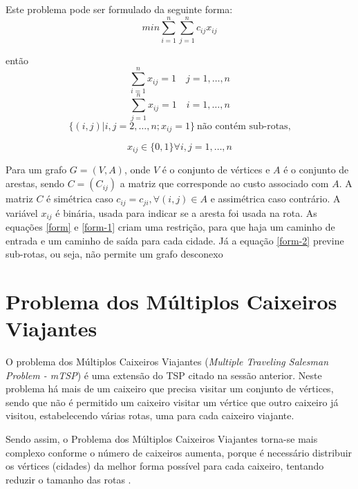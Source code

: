 \documentclass[12pt,openright,a4paper,oneside]{tcc}
\begin{document}
		Este problema pode ser formulado da seguinte forma:
		\begin{equation}
 		   	min\sum_{i=1}^{n} \sum_{j=1}^{n} c_{ij} x_{ij}
		\end{equation}
		
		então		
		\begin{equation}
			\label{form}
 		   	\sum_{i=1}^{n} x_{ij} = 1 \quad j=1,\dots,n
		\end{equation}
		\begin{equation}
			\label{form-1}
 		   	\sum_{j=1}^{n} x_{ij} = 1 \quad i=1,\dots,n
		\end{equation}
		\begin{equation}
		\label{form-2}
 		   	\{(i,j)|i,j=2,\dots,n; x_{ij}=1\} ~\text{não contém sub-rotas,}
		\end{equation}
		
		\begin{equation}
		\label{form-3}
 		   	x_{ij} \in \{0,1\}\forall i,j=1,\dots,n
		\end{equation}
		
			
		Para um grafo  $G=(V,A)$, onde $V$ é o conjunto de vértices e $A$  é o conjunto de arestas, sendo $C = (C_{ij})$ a matriz que corresponde ao custo associado com $A$. A matriz $C$ é simétrica caso $c_{ij}=c_{ji},\forall(i,j) \in A$ e assimétrica caso contrário. A variável $x_{ij}$ é binária, usada para indicar se a aresta foi usada na rota. As equações \ref{form} e \ref{form-1} criam uma restrição, para que haja um caminho de entrada e um caminho de saída para cada cidade. Já a equação \ref{form-2} previne sub-rotas, ou seja, não permite um grafo desconexo \cite{dissertation}
	
	\section{Problema dos Múltiplos Caixeiros Viajantes}

		O problema dos Múltiplos Caixeiros Viajantes (\textit{Multiple Traveling Salesman Problem - mTSP}) é uma extensão do TSP citado na sessão anterior.
		Neste problema há mais de um caixeiro que precisa visitar um conjunto de vértices, sendo que não é permitido um caixeiro visitar um vértice que outro caixeiro já visitou, estabelecendo várias rotas, uma para cada caixeiro viajante.

		Sendo assim, o Problema dos Múltiplos Caixeiros Viajantes torna-se  mais complexo conforme o número de caixeiros aumenta, porque é necessário distribuir os vértices (cidades) da melhor forma possível para cada caixeiro, tentando reduzir o tamanho das rotas \cite{dissertation}. 
\end{document}
